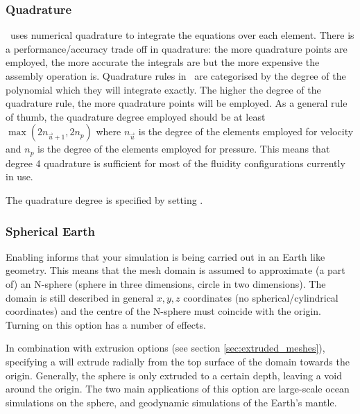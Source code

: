 \subsubsection{Quadrature}
\fluidity\ uses numerical quadrature to integrate the equations over each
element. There is a performance/accuracy trade off in quadrature: the more
quadrature points are employed, the more accurate the integrals are but
the more expensive the assembly operation is. Quadrature rules in \fluidity\ are categorised by the degree of the polynomial which they will integrate
exactly. The higher the degree of the quadrature rule, the more quadrature
points will be employed. As a general rule of thumb, the quadrature
degree employed should be at least $\max(2n_{\vec{u}+1},2n_p)$ where
$n_{\vec{u}}$ is the degree of the elements employed for velocity and $n_p$
is the degree of the elements employed for pressure. This means that degree
4 quadrature is sufficient for most of the fluidity configurations currently
in use.

The quadrature degree is specified by setting .

\subsubsection{Spherical Earth}
\label{sec:spherical_earth}

Enabling  informs \fluidity that your
simulation is being carried out in an Earth like geometry. This means that the mesh domain is assumed to approximate (a part of) an
N-sphere (sphere in three dimensions, circle in two dimensions). The domain is still described in
general $x,y,z$ coordinates (no spherical/cylindrical coordinates)
and the centre of the N-sphere must coincide with the origin.  Turning on this option has a number of effects.

In combination with extrusion options (see section \ref{sec:extruded_meshes}),
specifying a  will extrude radially from the top surface of the
domain towards the origin.  Generally, the sphere is only extruded to a certain
depth, leaving a void around the origin. The two main applications of this
option are large-scale ocean simulations on the sphere, and geodynamic simulations of the
Earth's mantle.

